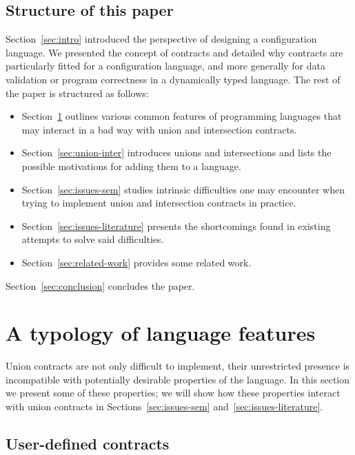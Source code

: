 \documentclass[sigplan,10pt,review,anonymous]{acmart}
\newcommand{\unsure}[2][1=]{}
\begin{document}
\subsection{Structure of this paper}
\unsure{Make this section into a contributions section?}
Section~\ref{sec:intro} introduced the perspective of designing a configuration
language. We presented the concept of contracts and detailed why contracts are
particularly fitted for a configuration language, and more generally for data
validation or program correctness in a dynamically typed language. The rest of
the paper is structured as follows:
\begin{itemize}
    \item Section~\ref{sec:feat-lang} outlines various common features of
        programming languages that may interact in a bad way with union and
        intersection contracts.
    \item Section~\ref{sec:union-inter} introduces unions and intersections and
        lists the possible motivations for adding them to a language.
    \item Section~\ref{sec:issues-sem} studies intrinsic difficulties one may
        encounter when trying to implement union and intersection contracts in
        practice.
    \item Section~\ref{sec:issues-literature} presents the shortcomings found in
        existing attempts to solve said difficulties.
    \item Section~\ref{sec:related-work} provides some related work.
\end{itemize}

Section~\ref{sec:conclusion} concludes the paper.


\section{A typology of language features}
\label{sec:feat-lang}

Union contracts are not only difficult to implement, their
unrestricted presence is incompatible with potentially desirable
properties of the language. In this section we present some of these
properties; we will show how these properties interact with union
contracts in Sections~\ref{sec:issues-sem}
and~\ref{sec:issues-literature}.

\subsection{User-defined contracts}
\label{sec:flat-contracts}
\end{document}
